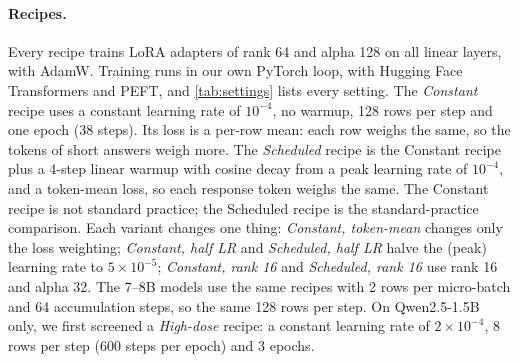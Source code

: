 \documentclass[11pt]{article}
\begin{document}
\paragraph{Recipes.} Every recipe trains LoRA adapters \citep{hu2022lora} of
rank 64 and alpha 128 on all linear layers, with AdamW. Training runs in our
own PyTorch loop, with Hugging Face Transformers and PEFT, and
\cref{tab:settings} lists every setting. The \emph{Constant}
recipe uses a constant learning rate of $10^{-4}$, no warmup, 128 rows per step
and one epoch (38 steps). Its loss is a per-row mean: each row weighs the same,
so the tokens of short answers weigh more. The \emph{Scheduled} recipe is the
Constant recipe plus a 4-step linear warmup with cosine decay from a peak
learning rate of $10^{-4}$, and a token-mean loss, so each response token
weighs the same. The Constant recipe is not standard practice; the Scheduled
recipe is the standard-practice comparison. Each variant changes one thing:
\emph{Constant, token-mean} changes only the loss weighting; \emph{Constant,
half LR} and \emph{Scheduled, half LR} halve the (peak) learning rate to
$5 \times 10^{-5}$; \emph{Constant, rank 16} and \emph{Scheduled, rank 16} use
rank 16 and alpha 32. The 7--8B models use the same recipes with 2 rows per
micro-batch and 64 accumulation steps, so the same 128 rows per step. On
Qwen2.5-1.5B only, we first screened a \emph{High-dose} recipe: a constant
learning rate of $2 \times 10^{-4}$, 8 rows per step (600 steps per epoch) and
3 epochs.

\end{document}
